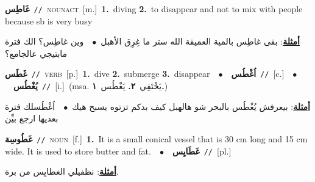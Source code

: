 \documentclass[10pt,a4paper,twoside]{article} %
\begin{document}
\begin{multicols}{2}
{\setlength\topsep{0pt}\textbf{\foreignlanguage{arabic}{غَاطِس}}\ {\color{gray}\texttt{//}\color{black}}\ \textsc{noun\textunderscore act}\ [m.]\ \textbf{1.}~diving  \textbf{2.}~to disappear and not to mix with people because sb is very busy\  \begin{flushright}\color{gray}\foreignlanguage{arabic}{\textbf{\underline{\foreignlanguage{arabic}{أمثلة}}}: بقى غاطِس بالمية العميقة الله ستر ما غِرِق الأهبل\ $\bullet$\ \  وين غاطِس؟ الك فترة مابتيجي عالجامع؟}\end{flushright}\color{black}} \vspace{2mm}

{\setlength\topsep{0pt}\textbf{\foreignlanguage{arabic}{غَطَس}}\ {\color{gray}\texttt{//}\color{black}}\ \textsc{verb}\ [p.]\ \textbf{1.}~dive  \textbf{2.}~submerge  \textbf{3.}~disappear\ \ $\bullet$\ \ \setlength\topsep{0pt}\textbf{\foreignlanguage{arabic}{اُغْطُس}}\ {\color{gray}\texttt{//}\color{black}}\ [c.]\ \ $\bullet$\ \ \setlength\topsep{0pt}\textbf{\foreignlanguage{arabic}{يُغْطُس}}\ {\color{gray}\texttt{//}\color{black}}\ [i.]\ \color{gray}(msa. \foreignlanguage{arabic}{يَخْتَفِي}~\foreignlanguage{arabic}{\textbf{٢.}}  \foreignlanguage{arabic}{يَغْطُس}~\foreignlanguage{arabic}{\textbf{١.}})\color{black}\  \begin{flushright}\color{gray}\foreignlanguage{arabic}{\textbf{\underline{\foreignlanguage{arabic}{أمثلة}}}: بيعرفش يُغْطُس بالبحر شو هالهبل كيف بدكم تزتوه يسبح هيك\ $\bullet$\ \  اُغْطُسلك فترة بعديها ارجع بيِّن}\end{flushright}\color{black}} \vspace{2mm}

{\setlength\topsep{0pt}\textbf{\foreignlanguage{arabic}{غَطُوسِة}}\ {\color{gray}\texttt{//}\color{black}}\ \textsc{noun}\ [f.]\ \textbf{1.}~It is a small conical vessel that is 30 cm long and 15 cm wide. It is used to store butter and fat.\ \ $\bullet$\ \ \setlength\topsep{0pt}\textbf{\foreignlanguage{arabic}{غَطَايِس}}\ {\color{gray}\texttt{//}\color{black}}\ [pl.]\  \begin{flushright}\color{gray}\foreignlanguage{arabic}{\textbf{\underline{\foreignlanguage{arabic}{أمثلة}}}: نظفيلي الغطايِس من برة.}\end{flushright}\color{black}} \vspace{2mm}


\end{multicols}
\end{document}
